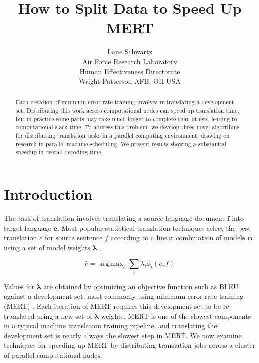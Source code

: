 \documentclass[11pt,letterpaper]{article}
\title{How to Split Data to Speed Up MERT}
\author{Lane Schwartz\\
  Air Force Research Laboratory\\
  Human Effectiveness Directorate\\
  Wright-Patterson AFB, OH USA
}
\DeclareMathOperator*{\argmax}{arg\,max}
\begin{document}
\maketitle

\renewcommand{\topfraction}{0.9}
\renewcommand{\bottomfraction}{0.8}
\renewcommand{\textfraction}{0.05}
\renewcommand{\dbltopfraction}{0.9}
\renewcommand{\dblfloatpagefraction}{0.9}
\setcounter{topnumber}{10}
\setcounter{bottomnumber}{10}
\setcounter{totalnumber}{10}
\setcounter{dbltopnumber}{10}
%



\begin{abstract}
Each iteration of minimum error rate training involves re-translating a development set. Distributing this work across computational nodes can speed up translation time, but in practice some parts may take much longer to complete than others, leading to computational slack time. To address this problem, we develop three novel algorithms for distributing translation tasks in a parallel computing environment, drawing on research in parallel machine scheduling. We present results showing a substantial speedup in overall decoding time.
\end{abstract}



\section{Introduction}

The task of translation involves translating a source language document $\mathbf{f}$ into target language $\mathbf{e}$. Most popular statistical translation techniques select the best translation $\hat{e}$ for source sentence $f$ according to a linear combination of models $\bm{\phi}$ using a set of model weights $\bm{\lambda}$ \cite{ochney02}. 

\begin{equation}
\hat{e} = \argmax_e \sum_i \lambda_i \phi_i(e,f)
\label{eq:smt}
\end{equation}


Values for $\bm{\lambda}$ are obtained by optimizing an objective function such as BLEU \cite{papinenietal01} against a development set, most commonly using minimum error rate training (MERT) \cite{och03}. Each iteration of MERT requires this development set to be re-translated using a new set of $\bm{\lambda}$ weights. MERT is one of the slowest components in a typical machine translation training pipeline, and translating the development set is nearly always the slowest step in MERT. We now examine techniques for speeding up MERT by distributing translation jobs across a cluster of parallel computational nodes. 
\end{document}
